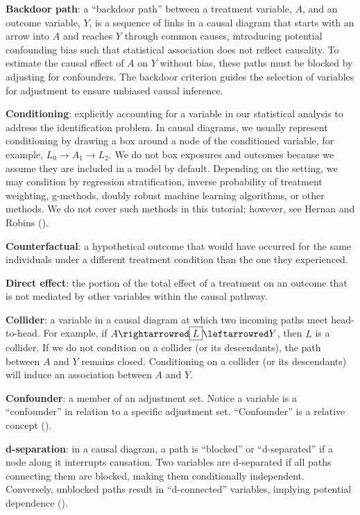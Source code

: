 \documentclass[
  singlecolumn]{article}
\begin{document}
\textbf{Backdoor path}: a ``backdoor path'' between a treatment
variable, \(A\), and an outcome variable, \(Y\), is a sequence of links
in a causal diagram that starts with an arrow into \(A\) and reaches
\(Y\) through common causes, introducing potential confounding bias such
that statistical association does not reflect causality. To estimate the
causal effect of \(A\) on \(Y\) without bias, these paths must be
blocked by adjusting for confounders. The backdoor criterion guides the
selection of variables for adjustment to ensure unbiased causal
inference.

\textbf{Conditioning}: explicitly accounting for a variable in our
statistical analysis to address the identification problem. In causal
diagrams, we usually represent conditioning by drawing a box around a
node of the conditioned variable, for example,
\(\boxed{L_{0}}\to A_{1} \to L_{2}\). We do not box exposures and
outcomes because we assume they are included in a model by default.
Depending on the setting, we may condition by regression stratification,
inverse probability of treatment weighting, g-methods, doubly robust
machine learning algorithms, or other methods. We do not cover such
methods in this tutorial; however, see Hernan and Robins
().

\textbf{Counterfactual}: a hypothetical outcome that would have occurred
for the same individuals under a different treatment condition than the
one they experienced.

\textbf{Direct effect}: the portion of the total effect of a treatment
on an outcome that is not mediated by other variables within the causal
pathway.

\textbf{Collider}: a variable in a causal diagram at which two incoming
paths meet head-to-head. For example, if
\(A \rightarrowred \boxed{L} \leftarrowred Y\), then \(L\) is a
collider. If we do not condition on a collider (or its descendants), the
path between \(A\) and \(Y\) remains closed. Conditioning on a collider
(or its descendants) will induce an association between \(A\) and \(Y\).

\textbf{Confounder}: a member of an adjustment set. Notice a variable is
a ``confounder'' in relation to a specific adjustment set.
``Confounder'' is a relative concept ().

\textbf{d-separation}: in a causal diagram, a path is ``blocked'' or
``d-separated'' if a node along it interrupts causation. Two variables
are d-separated if all paths connecting them are blocked, making them
conditionally independent. Conversely, unblocked paths result in
``d-connected'' variables, implying potential dependence
().
\end{document}
